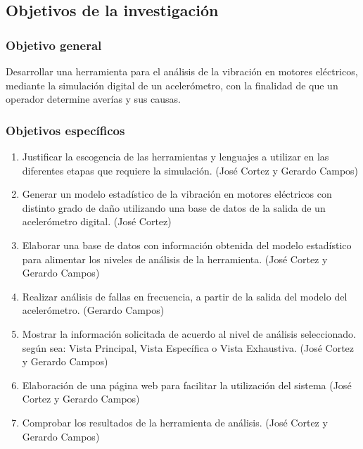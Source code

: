 \subsection{Objetivos de la investigación}

\subsubsection{Objetivo general}
	Desarrollar una herramienta para el análisis de la vibración en motores eléctricos, mediante la simulación digital de un acelerómetro, con la finalidad de que un operador determine averías y sus causas.


\subsubsection{Objetivos específicos}

	\begin{enumerate}
		\item Justificar la escogencia de las herramientas y lenguajes a utilizar en las diferentes etapas que requiere la simulación. (José Cortez y Gerardo Campos)

		\item Generar un modelo estadístico de la vibración en motores eléctricos con distinto grado de daño utilizando una base de datos de la salida de un acelerómetro digital. (José Cortez)

		\item Elaborar una base de datos con información obtenida del modelo estadístico para alimentar los niveles de análisis de la herramienta. (José Cortez y Gerardo Campos) 
		
		\item Realizar análisis de fallas en frecuencia, a partir de la salida del modelo del acelerómetro. (Gerardo Campos)

		\item Mostrar la información solicitada de acuerdo al nivel de análisis seleccionado. según sea: Vista Principal, Vista Específica o Vista Exhaustiva. (José Cortez y Gerardo Campos)

		\item Elaboración de una página web para facilitar la utilización del sistema (José Cortez y Gerardo Campos)

		\item Comprobar los resultados de la herramienta de análisis. (José Cortez y Gerardo Campos)
	\end{enumerate}
